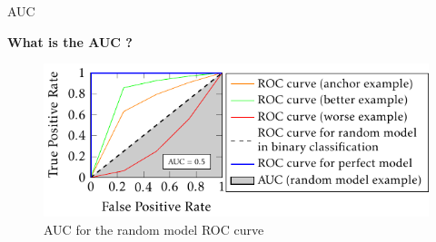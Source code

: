 \begin{frame}{AUC}
    
    {\large\textbf{What is the AUC ?}}

    \begin{figure}
        \centering
        \includegraphics[page=1]{images/output-figure2.pdf}
        \caption{AUC for the random model ROC curve}
    \end{figure}

                

\end{frame}
